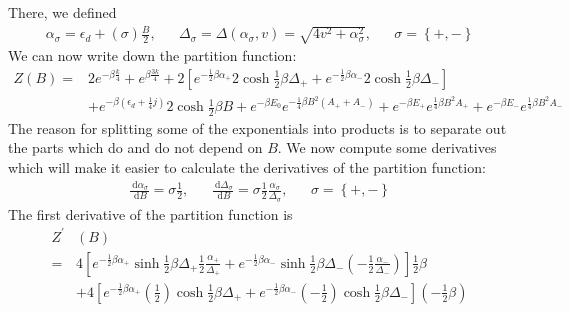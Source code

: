 \documentclass[12pt,twoside]{report}
\numberwithin{equation}{section}
\begin{document}
{\pb There, we defined
\begin{equation}\begin{aligned}
	\alpha_\sigma = \epsilon_d + \left(\sigma\right) \frac{B}{2}, && \Delta_\sigma = \Delta\left(\alpha_\sigma, v\right) = \sqrt{4v^2 + \alpha_\sigma^2}, && \sigma = \left\{+, -\right\}
\end{aligned}\end{equation}
We can now write down the partition function:
\begin{equation}\begin{aligned}
	Z(B) =& 2 e^{-\beta \frac{k}{4}} + e^{\beta \frac{3k}{4}} + 2\left[e^{-\frac{1}{2}\beta\alpha_+}2\cosh{\frac{1}{2}\beta \Delta_+} + e^{-\frac{1}{2}\beta\alpha_-}2\cosh{\frac{1}{2}\beta \Delta_-}\right] \\
	     &+ e^{-\beta\left( \epsilon_d + \frac{1}{4}j \right) }2\cosh{\frac{1}{2}\beta B} + e^{-\beta E_0}e^{-\frac{1}{4}\beta B^2\left(A_+ + A_-\right)} + e^{-\beta E_+}e^{\frac{1}{4}\beta B^2 A_+} + e^{-\beta E_-}e^{\frac{1}{4}\beta B^2 A_-}
\end{aligned}\end{equation}
The reason for splitting some of the exponentials into products is to separate out the parts which do and do not depend on \(B\). We now compute some derivatives which will make it easier to calculate the derivatives of the partition function:
\begin{equation}\begin{aligned}
	\frac{\:\mathrm{d}\alpha_{\sigma}}{\:\mathrm{d}B} = \sigma \frac{1}{2}, && \frac{\:\mathrm{d}\Delta_{\sigma}}{\:\mathrm{d}B} = \sigma \frac{1}{2} \frac{\alpha_{\sigma}}{\Delta_{\sigma}}, && \sigma = \left\{+, -\right\}
\end{aligned}\end{equation}
The first derivative of the partition function is
\begin{equation}\begin{aligned}
	Z^\prime&(B)\\
	=& 4\left[e^{-\frac{1}{2}\beta\alpha_+}\sinh{\frac{1}{2}\beta \Delta_+} \frac{1}{2} \frac{\alpha_{+}}{\Delta_{+}} + e^{-\frac{1}{2}\beta\alpha_-}\sinh{\frac{1}{2}\beta \Delta_-}\left(-\frac{1}{2}\frac{\alpha_{-}}{\Delta_{-}}\right)\right]\frac{1}{2}\beta \\
		     &+4\left[e^{-\frac{1}{2}\beta\alpha_+}\left( \frac{1}{2} \right) \cosh{\frac{1}{2}\beta \Delta_+} + e^{-\frac{1}{2}\beta\alpha_-}\left(-\frac{1}{2} \right)\cosh{\frac{1}{2}\beta \Delta_-}\right]\left(-\frac{1}{2}\beta\right)\\

\end{aligned}
\end{equation}}
\end{document}
